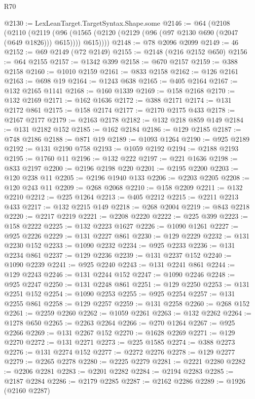\begin{lexlean}{R70}
\begin{coremodule}
@2130 := LexLeanTarget.TargetSyntax.Shape.some
@2146 := @64
    (@2108
      (@2110
        (@2119
          (@96 (@1565 (@2120 (@2129 (@96 (@97 @2130 @690 (@2047 (@649 @1826))) @615)))) @615))))
@2148 := @78 @2096 @2099
@2149 := 46
@2152 := @69 @2149 (@72 @2149)
@2155 := @2148 (@216 @2152 @650)
@2156 := @64 @2155
@2157 := @1342 @399
@2158 := @670 @2157
@2159 := @388 @2158
@2160 := @1010 @2159
@2161 := @833 @2158
@2162 := @126 @2161
@2163 := @698 @19
@2164 := @1243 @638
@2165 := @405 @2164
@2167 := @132 @2165 @1141
@2168 := @160 @1339
@2169 := @158 @2168
@2170 := @132 @2169
@2171 := @162 @1636
@2172 := @388 @2171
@2174 := @131 @2172 @861
@2175 := @158 @2174
@2177 := @2170 @2175 @433
@2178 := @2167 @2177
@2179 := @2163 @2178
@2182 := @132 @218 @859 @149
@2184 := @131 @2182 @152
@2185 := @162 @2184
@2186 := @129 @2185
@2187 := @748 @2186
@2188 := @871 @19
@2189 := @1093 @1264
@2190 := @925 @2189
@2192 := @131 @2190 @758
@2193 := @1059 @2192
@2194 := @2188 @2193
@2195 := @1760 @11
@2196 := @132 @222
@2197 := @221 @1636
@2198 := @833 @2197
@2200 := @2196 @2198 @220
@2201 := @2195 @2200
@2203 := @120 @238 @11
@2205 := @2196 @1940 @133
@2206 := @2203 @2205
@2208 := @120 @243 @11
@2209 := @268 @2068
@2210 := @158 @2209
@2211 := @132 @2210
@2212 := @225 @1264
@2213 := @405 @2212
@2215 := @2211 @2213 @433
@2217 := @132 @2215 @149
@2218 := @268 @2004
@2219 := @843 @2218
@2220 := @2217 @2219
@2221 := @2208 @2220
@2222 := @225 @399
@2223 := @158 @2222
@2225 := @132 @2223 @1627
@2226 := @1090 @1261
@2227 := @925 @2226
@2229 := @131 @2227 @861
@2230 := @129 @2229
@2232 := @131 @2230 @152
@2233 := @1090 @2232
@2234 := @925 @2233
@2236 := @131 @2234 @861
@2237 := @129 @2236
@2239 := @131 @2237 @152
@2240 := @1090 @2239
@2241 := @925 @2240
@2243 := @131 @2241 @861
@2244 := @129 @2243
@2246 := @131 @2244 @152
@2247 := @1090 @2246
@2248 := @925 @2247
@2250 := @131 @2248 @861
@2251 := @129 @2250
@2253 := @131 @2251 @152
@2254 := @1090 @2253
@2255 := @925 @2254
@2257 := @131 @2255 @861
@2258 := @129 @2257
@2259 := @131 @2258
@2260 := @268 @152
@2261 := @2259 @2260
@2262 := @1059 @2261
@2263 := @132 @2262
@2264 := @1278 @650
@2265 := @2263 @2264
@2266 := @270 @1264
@2267 := @925 @2266
@2269 := @131 @2267 @152
@2270 := @1628 @2269
@2271 := @129 @2270
@2272 := @131 @2271
@2273 := @225 @1585
@2274 := @388 @2273
@2276 := @131 @2274 @152
@2277 := @2272 @2276
@2278 := @129 @2277
@2279 := @2265 @2278
@2280 := @2225 @2279
@2281 := @2221 @2280
@2282 := @2206 @2281
@2283 := @2201 @2282
@2284 := @2194 @2283
@2285 := @2187 @2284
@2286 := @2179 @2285
@2287 := @2162 @2286
@2289 := @1926 (@2160 @2287)

\end{coremodule}
\end{lexlean}
